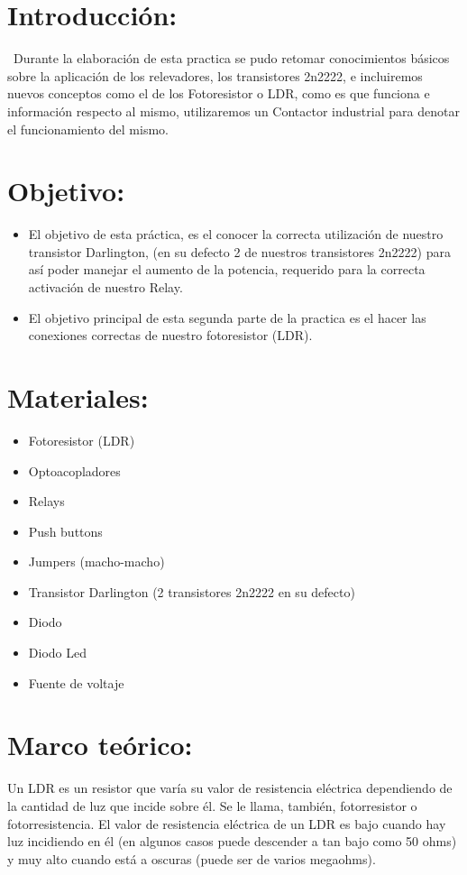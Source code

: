 \documentclass[14pt,letterpaper]{article}
\begin{document}
\newpage
\section{Introducción:}
\
Durante la elaboración de esta practica se pudo retomar conocimientos básicos sobre la aplicación de los relevadores, los transistores 2n2222, e incluiremos nuevos conceptos como el de los Fotoresistor o LDR, como es que funciona e información respecto al mismo, utilizaremos un Contactor industrial para denotar el funcionamiento del mismo.

\section{Objetivo:}
\begin{itemize}
\item El objetivo de esta práctica, es el conocer la correcta utilización de nuestro transistor Darlington, (en su defecto 2 de nuestros transistores 2n2222) para así poder manejar el aumento de la potencia, requerido para la correcta activación de nuestro Relay.
\item El objetivo principal de esta segunda parte de la practica es el hacer las conexiones correctas de nuestro fotoresistor (LDR).
\end{itemize}
\section{Materiales:}
\begin{itemize}
\item Fotoresistor (LDR)
\item Optoacopladores
\item Relays
\item Push buttons
\item Jumpers (macho-macho)
\item Transistor Darlington (2 transistores 2n2222 en su defecto)
\item Diodo
\item Diodo Led
\item Fuente de voltaje
\end{itemize}
\section{Marco teórico:}
Un LDR es un resistor que varía su valor de resistencia eléctrica dependiendo de la cantidad de luz que incide sobre él. Se le llama, también, fotorresistor o fotorresistencia. El valor de resistencia eléctrica de un LDR es bajo cuando hay luz incidiendo en él (en algunos casos puede descender a tan bajo como 50 ohms) y muy alto cuando está a oscuras (puede ser de varios megaohms).
\end{document}
